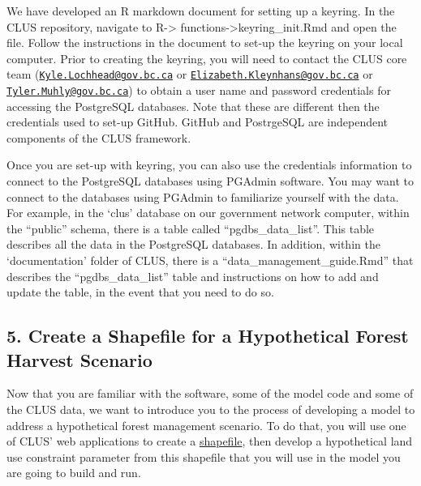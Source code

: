 \documentclass[
]{article}
\begin{document}
We have developed an R markdown document for setting up a keyring. In
the CLUS repository, navigate to R-\textgreater{}
functions-\textgreater keyring\_init.Rmd and open the file. Follow the
instructions in the document to set-up the keyring on your local
computer. Prior to creating the keyring, you will need to contact the
CLUS core team
(\href{mailto:Kyle.Lochhead@gov.bc.ca}{\nolinkurl{Kyle.Lochhead@gov.bc.ca}}
or
\href{mailto:Elizabeth.Kleynhans@gov.bc.ca}{\nolinkurl{Elizabeth.Kleynhans@gov.bc.ca}}
or
\href{mailto:Tyler.Muhly@gov.bc.ca}{\nolinkurl{Tyler.Muhly@gov.bc.ca}})
to obtain a user name and password credentials for accessing the
PostgreSQL databases. Note that these are different then the credentials
used to set-up GitHub. GitHub and PostrgeSQL are independent components
of the CLUS framework.

Once you are set-up with keyring, you can also use the credentials
information to connect to the PostgreSQL databases using PGAdmin
software. You may want to connect to the databases using PGAdmin to
familiarize yourself with the data. For example, in the `clus' database
on our government network computer, within the ``public'' schema, there
is a table called ``pgdbs\_data\_list''. This table describes all the
data in the PostgreSQL databases. In addition, within the
`documentation' folder of CLUS, there is a
``data\_management\_guide.Rmd'' that describes the ``pgdbs\_data\_list''
table and instructions on how to add and update the table, in the event
that you need to do so.

\hypertarget{create-a-shapefile-for-a-hypothetical-forest-harvest-scenario}{%
\subsection{5. Create a Shapefile for a Hypothetical Forest Harvest
Scenario}\label{create-a-shapefile-for-a-hypothetical-forest-harvest-scenario}}

Now that you are familiar with the software, some of the model code and
some of the CLUS data, we want to introduce you to the process of
developing a model to address a hypothetical forest management scenario.
To do that, you will use one of CLUS' web applications to create a
\href{https://desktop.arcgis.com/en/arcmap/10.3/manage-data/shapefiles/what-is-a-shapefile.htm}{shapefile},
then develop a hypothetical land use constraint parameter from this
shapefile that you will use in the model you are going to build and run.
\end{document}
